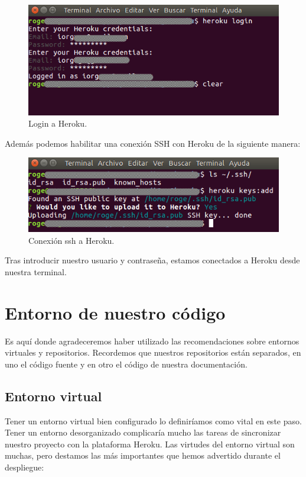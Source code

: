 \begin{figure}[!ht]
  \begin{center}
    \includegraphics[width=1\textwidth]{../images/heroku_login.png}
    \caption{Login a Heroku.}
    \label{fig:heroku_ssh}
  \end{center}
\end{figure}



\bigskip
Además podemos habilitar una conexión SSH con Heroku de la siguiente manera:


\begin{figure}[!ht]
  \begin{center}
    \includegraphics[width=1\textwidth]{../images/heroku_ssh.png}
    \caption{Conexión ssh a Heroku.}
    \label{fig:heroku_ssh}
  \end{center}
\end{figure}


\bigskip
Tras introducir nuestro usuario y contraseña, estamos conectados a Heroku desde nuestra terminal.


\section{Entorno de nuestro código}
Es aquí donde agradeceremos haber utilizado las recomendaciones sobre entornos virtuales y repositorios. Recordemos que nuestros repositorios están separados, en uno el código fuente y en otro el código de nuestra documentación.

\subsection{Entorno virtual}
Tener un entorno virtual bien configurado lo definiríamos como vital en este paso. Tener un entorno desorganizado complicaría mucho las tareas de sincronizar nuestro proyecto con la plataforma Heroku. Las virtudes del entorno virtual son muchas, pero destamos las más importantes que hemos advertido durante el despliegue:

